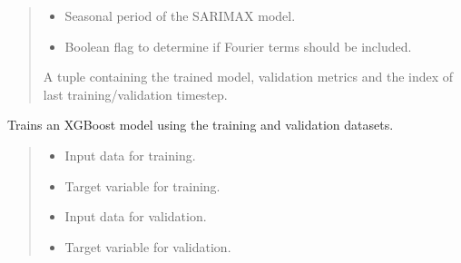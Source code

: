 \documentclass[letterpaper,10pt,english]{sphinxmanual}
\begin{document}
\begin{fulllineitems}
\begin{fulllineitems}
\begin{quote}
\begin{description}
\begin{itemize}
\item {} 
\sphinxAtStartPar
{} \textendash{} Seasonal period of the SARIMAX model.

\item {} 
\sphinxAtStartPar
{} \textendash{} Boolean flag to determine if Fourier terms should be included.

\end{itemize}

\sphinxAtStartPar
A tuple containing the trained model, validation metrics and the index of last training/validation timestep.

\end{description}\end{quote}

\end{fulllineitems}


\begin{fulllineitems}
\label{\detokenize{docs/training_module:training_module.ModelTraining.train_XGB_model}}
\pysigstartsignatures
{}
\pysigstopsignatures
\sphinxAtStartPar
Trains an XGBoost model using the training and validation datasets.
\begin{quote}\begin{description}
\begin{itemize}
\item {} 
\sphinxAtStartPar
{} \textendash{} Input data for training.

\item {} 
\sphinxAtStartPar
{} \textendash{} Target variable for training.

\item {} 
\sphinxAtStartPar
{} \textendash{} Input data for validation.

\item {} 
\sphinxAtStartPar
{} \textendash{} Target variable for validation.


\end{itemize}
\end{description}
\end{quote}
\end{fulllineitems}
\end{fulllineitems}
\end{document}
